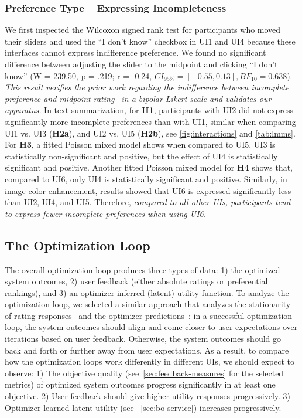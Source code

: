 \documentclass[acmsmall,screen,nonacm]{acmart}
\begin{document}
\subsubsection{Preference Type – Expressing Incompleteness}
We first inspected the Wilcoxon signed rank test for participants who moved their sliders and used the ``I don't know'' checkbox in UI1 and UI4 because these interfaces cannot express indifference preference.
%
We found no significant difference between adjusting the slider to the midpoint and clicking ``I don't know'' (W = 239.50, p = .219; r = -0.24, $CI_{95\%}=[-0.55, 0.13], BF_{10}=0.638$).
%
\emph{This result verifies the prior work regarding the indifference between incomplete preference and midpoint rating~\cite{armstrong1987mid} in a bipolar Likert scale and validates our apparatus.}
%
In text summarization, for \textbf{H1}, participants with UI2 did not express significantly more incomplete preferences than with UI1,
similar when comparing UI1 vs. UI3 (\textbf{H2a}), and UI2 vs. UI5 (\textbf{H2b}), see \autoref{fig:interactions} and \autoref{tab:lmms}.
%
For \textbf{H3}, a fitted Poisson mixed model shows when compared to UI5, UI3 is statistically non-significant
and positive, but the effect of UI4 is statistically significant and
positive.
%
Another fitted Poisson mixed model for \textbf{H4} shows that, compared to UI6, only UI4 is statistically significant and positive. Similarly, in image color enhancement, results showed that UI6 is expressed significantly less than UI2, UI4, and UI5. Therefore, \emph{compared to all other UIs, participants tend to express fewer incomplete preferences when using UI6.}

\subsection{The Optimization Loop}
The overall optimization loop produces three types of data: 1) the optimized system outcomes, 2) user feedback (either absolute ratings or preferential rankings), and 3) an optimizer-inferred (latent) utility function.
%
To analyze the optimization loop, we selected a similar approach that analyzes the stationarity of rating responses~\cite{ou2022infloop} and the optimizer predictions~\cite{ou2023expertise}: in a successful optimization loop, the system outcomes should align and come closer to user expectations over iterations based on user feedback. Otherwise, the system outcomes should go back and forth or further away from user expectations.
%
As a result, to compare how the optimization loops work differently in different UIs, we should expect to observe: 1) The objective quality (see~\autoref{sec:feedback-measures} for the selected metrics) of optimized system outcomes progress significantly in at least one objective. 2) User feedback should give higher utility responses progressively. 3) Optimizer learned latent utility (see ~\autoref{sec:bo-service}) increases progressively.
\end{document}
